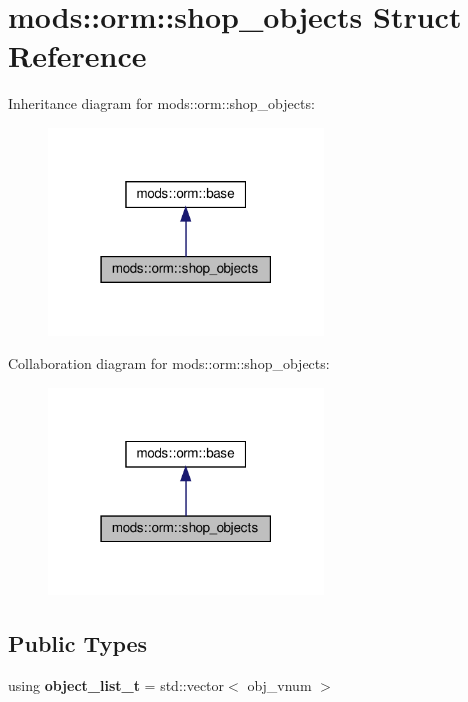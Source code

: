 \hypertarget{structmods_1_1orm_1_1shop__objects}{}\section{mods\+:\+:orm\+:\+:shop\+\_\+objects Struct Reference}
\label{structmods_1_1orm_1_1shop__objects}


Inheritance diagram for mods\+:\+:orm\+:\+:shop\+\_\+objects\+:
\nopagebreak
\begin{figure}[H]
\begin{center}
\leavevmode
\includegraphics[width=207pt]{structmods_1_1orm_1_1shop__objects__inherit__graph}
\end{center}
\end{figure}


Collaboration diagram for mods\+:\+:orm\+:\+:shop\+\_\+objects\+:
\nopagebreak
\begin{figure}[H]
\begin{center}
\leavevmode
\includegraphics[width=207pt]{structmods_1_1orm_1_1shop__objects__coll__graph}
\end{center}
\end{figure}
\subsection*{Public Types}
\begin{DoxyCompactItemize}
\item 
\mbox{\label{structmods_1_1orm_1_1shop__objects_a5d1db2b7f5c2d7a6cdde924d41c75016}} 
using {\bfseries object\+\_\+list\+\_\+t} = std\+::vector$<$ obj\+\_\+vnum $>$
\end{DoxyCompactItemize}
